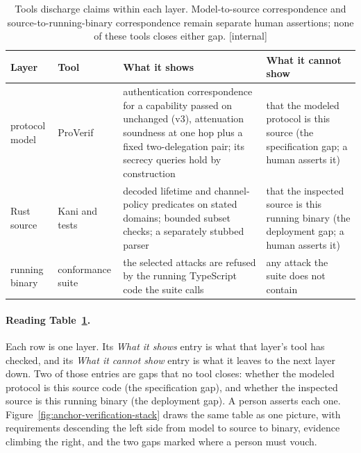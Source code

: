 \documentclass[11pt,a4paper]{article}
\theoremstyle{definition}
\begin{document}
\begin{table}[H]
\centering
\caption{Tools discharge claims within each layer. Model-to-source correspondence and source-to-running-binary correspondence remain separate human assertions; none of these tools closes either gap. [internal]}
\label{tab:anchor-verification-stack}
\small
\renewcommand{\arraystretch}{1.15}
\begin{tabularx}{\linewidth}{@{}l l >{\raggedright\arraybackslash}X >{\raggedright\arraybackslash}X@{}}
\toprule
\textbf{Layer} & \textbf{Tool} & \textbf{What it shows} & \textbf{What it cannot show} \\
\midrule
protocol model & ProVerif & authentication correspondence for a capability passed on unchanged (v3), attenuation soundness at one hop plus a fixed two-delegation pair; its secrecy queries hold by construction & that the modeled protocol is this source (the specification gap; a human asserts it) \\
Rust source & Kani and tests & decoded lifetime and channel-policy predicates on stated domains; bounded subset checks; a separately stubbed parser & that the inspected source is this running binary (the deployment gap; a human asserts it) \\
running binary & conformance suite & the selected attacks are refused by the running TypeScript code the suite calls & any attack the suite does not contain \\
\bottomrule
\end{tabularx}
\end{table}

\paragraph{Reading Table~\ref{tab:anchor-verification-stack}.} Each row is one layer. Its \emph{What it shows} entry is what that layer's tool has checked, and its \emph{What it cannot show} entry is what it leaves to the next layer down. Two of those entries are gaps that no tool closes: whether the modeled protocol is this source code (the specification gap), and whether the inspected source is this running binary (the deployment gap). A person asserts each one. Figure~\ref{fig:anchor-verification-stack} draws the same table as one picture, with requirements descending the left side from model to source to binary, evidence climbing the right, and the two gaps marked where a person must vouch.


\FloatBarrier
\end{document}
